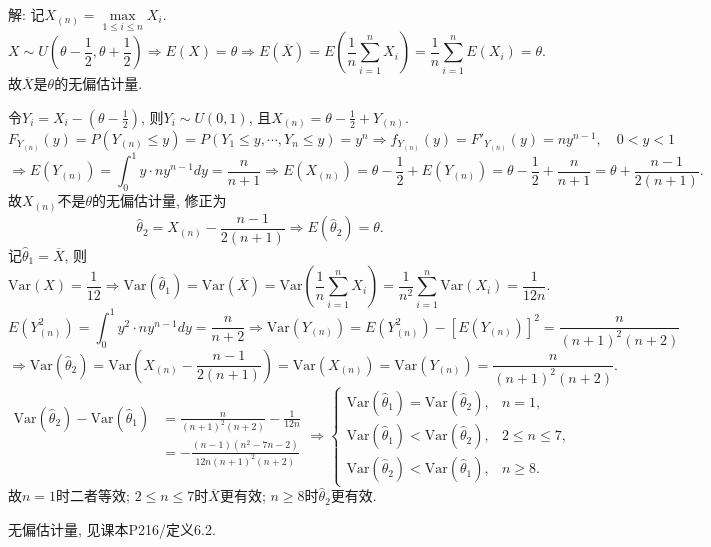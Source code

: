 \documentclass[standard]{ExBook}
\begin{document}
\begin{qitems}
\vspace{\dimexpr2.5cm-5em\relax}

解: 记$X_{(n)}=\max\limits_{1\leq i\leq n}X_i$.
$$
X\sim U\left(\theta-\frac{1}{2},\theta+\frac{1}{2}\right)
\Longrightarrow
E(X)=\theta
\Longrightarrow
E(\overline{X})
=E\left(\frac{1}{n}\sum\limits_{i=1}^{n}X_i\right)
=\frac{1}{n}\sum\limits_{i=1}^{n}E(X_i)
=\theta.
$$
故$\overline{X}$是$\theta$的无偏估计量.

令$Y_i=X_i-\left(\theta-\frac{1}{2}\right)$, 则$Y_i\sim U(0,1)$, 且$X_{(n)}=\theta-\frac{1}{2}+Y_{(n)}$.
$$
F_{Y_{(n)}}(y)=P(Y_{(n)}\leq y)=P(Y_1\leq y,\cdots,Y_n\leq y)=y^n
\Longrightarrow
f_{Y_{(n)}}(y)=F'_{Y_{(n)}}(y)=ny^{n-1},\quad 0<y<1
$$
$$
\Longrightarrow
E(Y_{(n)})=\int_{0}^{1}y\cdot ny^{n-1}dy=\frac{n}{n+1}
\Longrightarrow
E(X_{(n)})=\theta-\frac{1}{2}+E(Y_{(n)})
=\theta-\frac{1}{2}+\frac{n}{n+1}
=\theta+\frac{n-1}{2(n+1)}.
$$
故$X_{(n)}$不是$\theta$的无偏估计量, 修正为
$$
\hat{\theta}_2=X_{(n)}-\frac{n-1}{2(n+1)}
\Longrightarrow
E(\hat{\theta}_2)=\theta.
$$
记$\hat{\theta}_1=\overline{X}$, 则
$$
\mathrm{Var}(X)=\frac{1}{12}
\Longrightarrow
\mathrm{Var}(\hat{\theta}_1)
=\mathrm{Var}(\overline{X})
=\mathrm{Var}\left(\frac{1}{n}\sum\limits_{i=1}^{n}X_i\right)
=\frac{1}{n^2}\sum\limits_{i=1}^{n}\mathrm{Var}(X_i)
=\frac{1}{12n}.
$$
$$
E(Y_{(n)}^2)=\int_{0}^{1}y^2\cdot ny^{n-1}dy=\frac{n}{n+2}
\Longrightarrow
\mathrm{Var}(Y_{(n)})=E(Y_{(n)}^2)-[E(Y_{(n)})]^2
=\frac{n}{(n+1)^2(n+2)}
$$
$$
\Longrightarrow
\mathrm{Var}(\hat{\theta}_2)
=\mathrm{Var}\left(X_{(n)}-\frac{n-1}{2(n+1)}\right)
=\mathrm{Var}(X_{(n)})
=\mathrm{Var}(Y_{(n)})
=\frac{n}{(n+1)^2(n+2)}.
$$
$$
\begin{aligned}
\mathrm{Var}(\hat{\theta}_2)-\mathrm{Var}(\hat{\theta}_1)
&=\frac{n}{(n+1)^2(n+2)}-\frac{1}{12n}\\
&=-\frac{(n-1)(n^2-7n-2)}{12n(n+1)^2(n+2)}
\end{aligned}
\Longrightarrow
\left\{
\begin{array}{ll}
\mathrm{Var}(\hat{\theta}_1)=\mathrm{Var}(\hat{\theta}_2), & n=1,\\
\mathrm{Var}(\hat{\theta}_1)<\mathrm{Var}(\hat{\theta}_2), & 2\leq n\leq 7,\\
\mathrm{Var}(\hat{\theta}_2)<\mathrm{Var}(\hat{\theta}_1), & n\geq 8.
\end{array}
\right.
$$
故$n=1$时二者等效; $2\leq n\leq7$时$\overline{X}$更有效; $n\geq8$时$\hat{\theta}_2$更有效.

\textcolor{themeColor}{\selectfont {} 无偏估计量, 见课本P216/定义6.2.}


\end{qitems}
\end{document}

